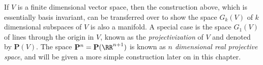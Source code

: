 


\begin{remark}
    If $V$ is a finite dimensional vector space, then the construction above, which is essentially basis invariant, can be transferred over to show the space $G_k(V)$ of $k$ dimensional subspaces of $V$ is also a manifold. A special case is the space $G_1(V)$ of lines through the origin in $V$, known as the \emph{projectivization} of $V$ and denoted by $\mathbf{P}(V)$. The space $\mathbf{P}^n = \mathbf{P}(\RR^{n+1})$ is known as \emph{$n$ dimensional real projective space}, and will be given a more simple construction later on in this chapter.
\end{remark}

